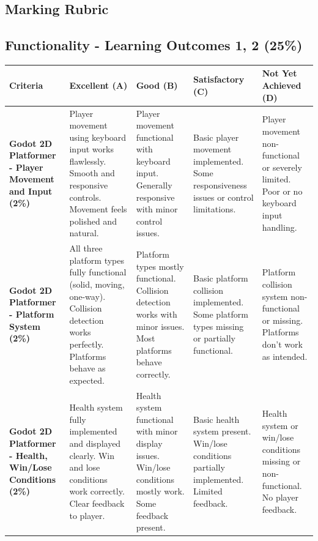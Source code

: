 \documentclass{article}
\begin{document}
	\begin{landscape}

	\section*{Marking Rubric}

	\subsection*{Functionality - Learning Outcomes 1, 2 (25\%)}

\renewcommand{\arraystretch}{1.3}
\begin{tabular}{|p{5cm}|p{4cm}|p{4cm}|p{4cm}|p{4cm}|}
\hline
\textbf{Criteria} & \textbf{Excellent (A)} & \textbf{Good (B)} & \textbf{Satisfactory (C)} & \textbf{Not Yet Achieved (D)} \\ \hline

\textbf{Godot 2D Platformer - Player Movement and Input (2\%)} & 
Player movement using keyboard input works flawlessly. Smooth and responsive controls. Movement feels polished and natural. & 
Player movement functional with keyboard input. Generally responsive with minor control issues. & 
Basic player movement implemented. Some responsiveness issues or control limitations. & 
Player movement non-functional or severely limited. Poor or no keyboard input handling. \\ \hline

\textbf{Godot 2D Platformer - Platform System (2\%)} & 
All three platform types fully functional (solid, moving, one-way). Collision detection works perfectly. Platforms behave as expected. & 
Platform types mostly functional. Collision detection works with minor issues. Most platforms behave correctly. & 
Basic platform collision implemented. Some platform types missing or partially functional. & 
Platform collision system non-functional or missing. Platforms don't work as intended. \\ \hline

\textbf{Godot 2D Platformer - Health, Win/Lose Conditions (2\%)} & 
Health system fully implemented and displayed clearly. Win and lose conditions work correctly. Clear feedback to player. & 
Health system functional with minor display issues. Win/lose conditions mostly work. Some feedback present. & 
Basic health system present. Win/lose conditions partially implemented. Limited feedback. & 
Health system or win/lose conditions missing or non-functional. No player feedback. \\ \hline


\end{tabular}
\end{landscape}
\end{document}
